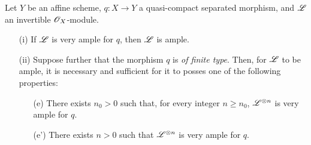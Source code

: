 \begin{proposition}[4.5.10]
\label{II.4.5.10}
Let $Y$ be an affine scheme, $q:X\to Y$ a quasi-compact separated morphism, and $\mathscr{L}$ an invertible $\mathscr{O}_X$-module.
\begin{enumerate}
  \item[\rm{(i)}] If $\mathscr{L}$ is very ample for $q$, then $\mathscr{L}$ is ample.
  \item[\rm{(ii)}] Suppose further that the morphism $q$ is \emph{of finite type}.
    Then, for $\mathscr{L}$ to be ample, it is necessary and sufficient for it to posses one of the following properties:
    \begin{enumerate}
      \item[\rm{(e)}] There exists $n_0>0$ such that, for every integer $n\geq n_0$, $\mathscr{L}^{\otimes n}$ is very ample for $q$.
      \item[\rm{(e')}] There exists $n>0$ such that $\mathscr{L}^{\otimes n}$ is very ample for $q$.
    \end{enumerate}
\end{enumerate}
\end{proposition}

